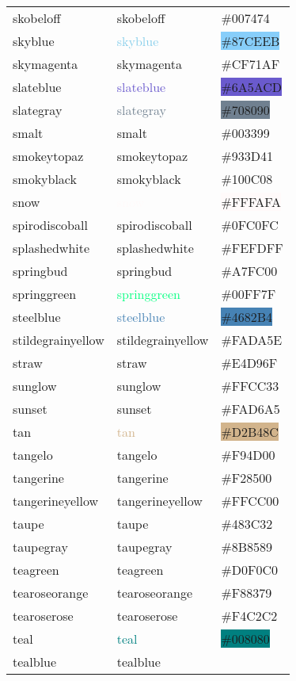\documentclass[
]{article}
\begin{document}
\begin{longtable}[]{@{}lll@{}}
skobeloff & \textcolor{skobeloff}{skobeloff} &
\colorbox{skobeloff}{\#007474}\tabularnewline
skyblue & \textcolor{skyblue}{skyblue} &
\colorbox{lightskyblue}{\#87CEEB}\tabularnewline
skymagenta & \textcolor{skymagenta}{skymagenta} &
\colorbox{skymagenta}{\#CF71AF}\tabularnewline
slateblue & \textcolor{slateblue}{slateblue} &
\colorbox{slateblue}{\#6A5ACD}\tabularnewline
slategray & \textcolor{slategray}{slategray} &
\colorbox{slategray}{\#708090}\tabularnewline
smalt & \textcolor{smalt}{smalt} &
\colorbox{darkpowderblue}{\#003399}\tabularnewline
smokeytopaz & \textcolor{smokeytopaz}{smokeytopaz} &
\colorbox{smokeytopaz}{\#933D41}\tabularnewline
smokyblack & \textcolor{smokyblack}{smokyblack} &
\colorbox{smokyblack}{\#100C08}\tabularnewline
snow & \textcolor{snow}{snow} & \colorbox{snow}{\#FFFAFA}\tabularnewline
spirodiscoball & \textcolor{spirodiscoball}{spirodiscoball} &
\colorbox{spirodiscoball}{\#0FC0FC}\tabularnewline
splashedwhite & \textcolor{splashedwhite}{splashedwhite} &
\colorbox{splashedwhite}{\#FEFDFF}\tabularnewline
springbud & \textcolor{springbud}{springbud} &
\colorbox{springbud}{\#A7FC00}\tabularnewline
springgreen & \textcolor{springgreen}{springgreen} &
\colorbox{guppiegreen}{\#00FF7F}\tabularnewline
steelblue & \textcolor{steelblue}{steelblue} &
\colorbox{steelblue}{\#4682B4}\tabularnewline
stildegrainyellow & \textcolor{stildegrainyellow}{stildegrainyellow} &
\colorbox{jonquil}{\#FADA5E}\tabularnewline
straw & \textcolor{straw}{straw} &
\colorbox{straw}{\#E4D96F}\tabularnewline
sunglow & \textcolor{sunglow}{sunglow} &
\colorbox{sunglow}{\#FFCC33}\tabularnewline
sunset & \textcolor{sunset}{sunset} &
\colorbox{deepchampagne}{\#FAD6A5}\tabularnewline
tan & \textcolor{tan}{tan} & \colorbox{tan}{\#D2B48C}\tabularnewline
tangelo & \textcolor{tangelo}{tangelo} &
\colorbox{tangelo}{\#F94D00}\tabularnewline
tangerine & \textcolor{tangerine}{tangerine} &
\colorbox{tangerine}{\#F28500}\tabularnewline
tangerineyellow & \textcolor{tangerineyellow}{tangerineyellow} &
\colorbox{tangerineyellow}{\#FFCC00}\tabularnewline
taupe & \textcolor{taupe}{taupe} &
\colorbox{darklava}{\#483C32}\tabularnewline
taupegray & \textcolor{taupegray}{taupegray} &
\colorbox{taupegray}{\#8B8589}\tabularnewline
teagreen & \textcolor{teagreen}{teagreen} &
\colorbox{teagreen}{\#D0F0C0}\tabularnewline
tearoseorange & \textcolor{tearoseorange}{tearoseorange} &
\colorbox{coralpink}{\#F88379}\tabularnewline
tearoserose & \textcolor{tearoserose}{tearoserose} &
\colorbox{babypink}{\#F4C2C2}\tabularnewline
teal & \textcolor{teal}{teal} & \colorbox{teal}{\#008080}\tabularnewline
tealblue & \textcolor{tealblue}{tealblue} &

\end{longtable}
\end{document}
